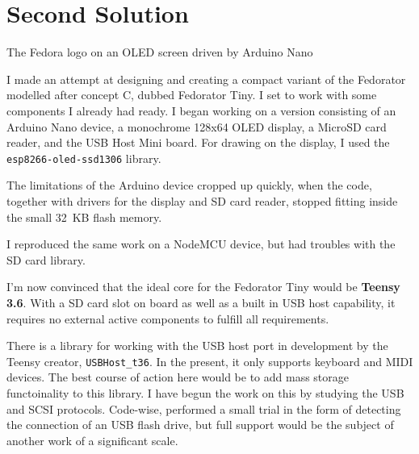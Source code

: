 \chapter{Second Solution}
    
        {The Fedora logo on an OLED screen driven by Arduino Nano}
    
    I made an attempt at designing and creating a compact variant of the Fedorator modelled after concept C, dubbed Fedorator Tiny.  I set to work with some components I already had ready.  I began working on a version consisting of an Arduino Nano device, a monochrome 128x64 OLED display, a MicroSD card reader, and the USB Host Mini board\cite{usb-host-shield}.  For drawing on the display, I used the \texttt{esp8266-oled-ssd1306} library\cite{esp8266-oled-ssd1306}.
    
    The limitations of the Arduino device cropped up quickly, when the code, together with drivers for the display and SD card reader, stopped fitting inside the small 32~KB flash memory.
    
    I reproduced the same work on a NodeMCU device, but had troubles with the SD card library.
    
    I'm now convinced that the ideal core for the Fedorator Tiny would be \textbf{Teensy 3.6}.  With a SD card slot on board as well as a built in USB host capability, it requires no external active components to fulfill all requirements.
    
    There is a library for working with the USB host port in development by the Teensy creator, \texttt{USBHost\_t36}\cite{usbhost_t36}.  In the present, it only supports keyboard and MIDI devices.  The best course of action here would be to add mass storage functoinality to this library.  I have begun the work on this by studying the USB and SCSI protocols.  Code-wise, performed a small trial in the form of detecting the connection of an USB flash drive, but full support would be the subject of another work of a significant scale.
    
    
    
